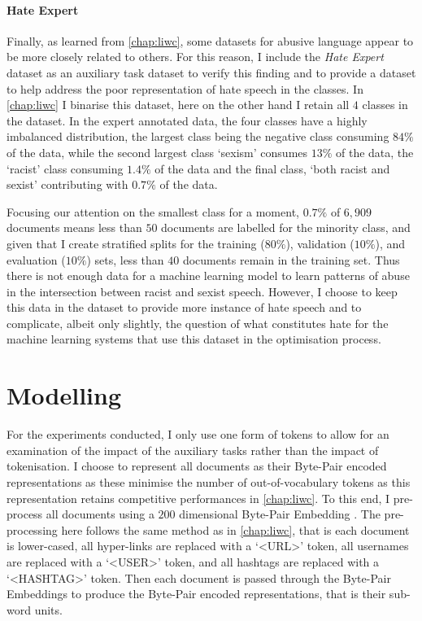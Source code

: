\paragraph{Hate Expert}
Finally, as learned from \cref{chap:liwc}, some datasets for abusive language appear to be more closely related to others.
For this reason, I include the \textit{Hate Expert} dataset as an auxiliary task dataset to verify this finding and to provide a dataset to help address the poor representation of hate speech in the classes.
In \cref{chap:liwc} I binarise this dataset, here on the other hand I retain all $4$ classes in the dataset. 
In the expert annotated data, the four classes have a highly imbalanced distribution, the largest class being the negative class consuming $84\%$ of the data, while the second largest class `sexism' consumes $13\%$ of the data, the `racist' class consuming $1.4\%$ of the data and the final class, `both racist and sexist' contributing with $0.7\%$ of the data.

Focusing our attention on the smallest class for a moment, $0.7\%$ of $6,909$ documents means less than $50$ documents are labelled for the minority class, and given that I create stratified splits for the training ($80\%$), validation ($10\%$), and evaluation ($10\%$) sets, less than $40$ documents remain in the training set.
Thus there is not enough data for a machine learning model to learn patterns of abuse in the intersection between racist and sexist speech.
However, I choose to keep this data in the dataset to provide more instance of hate speech and to complicate, albeit only slightly, the question of what constitutes hate for the machine learning systems that use this dataset in the optimisation process.

\section{Modelling}\label{sec:mtl_modelling}
For the experiments conducted, I only use one form of tokens to allow for an examination of the impact of the auxiliary tasks rather than the impact of tokenisation.
I choose to represent all documents as their Byte-Pair encoded representations as these minimise the number of out-of-vocabulary tokens as this representation retains competitive performances in \cref{chap:liwc}.
To this end, I pre-process all documents using a $200$ dimensional Byte-Pair Embedding \citep{Heinzerling:2018}.
The pre-processing here follows the same method as in \cref{chap:liwc}, that is each document is lower-cased, all hyper-links are replaced with a `<URL>' token, all usernames are replaced with a `<USER>' token, and all hashtags are replaced with a `<HASHTAG>' token.
Then each document is passed through the Byte-Pair Embeddings to produce the Byte-Pair encoded representations, that is their sub-word units.

